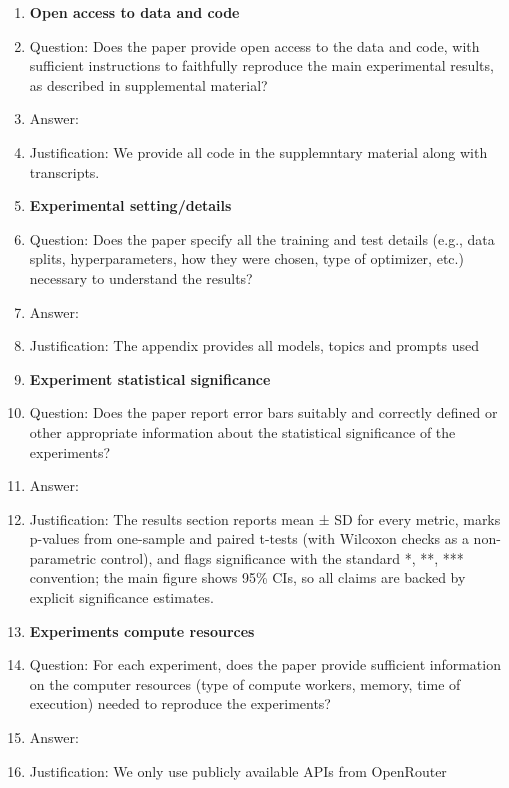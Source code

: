 \documentclass{article}
\begin{document}
\begin{enumerate}
\item {\bf Open access to data and code}
    \item[] Question: Does the paper provide open access to the data and code, with sufficient instructions to faithfully reproduce the main experimental results, as described in supplemental material?
    \item[] Answer: \answerYes{} %
    \item[] Justification: We provide all code in the supplemntary material along with transcripts.

\item {\bf Experimental setting/details}
    \item[] Question: Does the paper specify all the training and test details (e.g., data splits, hyperparameters, how they were chosen, type of optimizer, etc.) necessary to understand the results?
    \item[] Answer: \answerYes{} %
    \item[] Justification: The appendix provides all models, topics and prompts used

\item {\bf Experiment statistical significance}
    \item[] Question: Does the paper report error bars suitably and correctly defined or other appropriate information about the statistical significance of the experiments?
    \item[] Answer:\answerYes{} %
    \item[] Justification: The results section reports mean ± SD for every metric, marks p-values from one-sample and paired t-tests (with Wilcoxon checks as a non-parametric control), and flags significance with the standard *, **, *** convention; the main figure shows 95\% CIs, so all claims are backed by explicit significance estimates.{}

\item {\bf Experiments compute resources}
    \item[] Question: For each experiment, does the paper provide sufficient information on the computer resources (type of compute workers, memory, time of execution) needed to reproduce the experiments?
    \item[] Answer: \answerYes{} %
    \item[] Justification: We only use publicly available APIs from OpenRouter


\end{enumerate}
\end{document}
